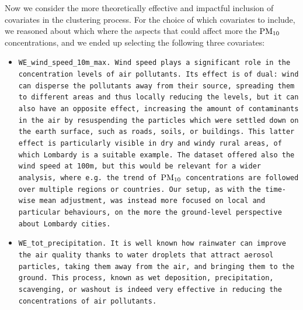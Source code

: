 \documentclass[12pt,	%
	a4paper,		%
	twoside,		%
	openright,		%
	titlepage,%
	]{book}
\theoremstyle{definition}
\begin{document}
Now we consider the more theoretically effective and impactful inclusion of covariates in the clustering process. For the choice of which covariates to include, we reasoned about which where the aspects that could affect more the $\text{PM}_{10}$ concentrations, and we ended up selecting the following three covariates:
\begin{itemize}
    \item \tt{WE\_wind\_speed\_10m\_max}. Wind speed plays a significant role in the concentration levels of air pollutants. Its effect is of dual: wind can disperse the pollutants away from their source, spreading them to different areas and thus locally reducing the levels, but it can also have an opposite effect, increasing the amount of contaminants in the air by resuspending the particles which were settled down on the earth surface, such as roads, soils, or buildings. This latter effect is particularly visible in dry and windy rural areas, of which Lombardy is a suitable example. The dataset offered also the wind speed at 100m, but this would be relevant for a wider analysis, where e.g. the trend of $\text{PM}_{10}$ concentrations are followed over multiple regions or countries. Our setup, as with the time-wise mean adjustment, was instead more focused on local and particular behaviours, on the more the ground-level perspective about Lombardy cities.
    
    \item \tt{WE\_tot\_precipitation}. It is well known how rainwater can improve the air quality thanks to water droplets that attract aerosol particles, taking them away from the air, and bringing them to the ground. This process, known as wet deposition, precipitation, scavenging, or washout is indeed very effective in reducing the concentrations of air pollutants. 


\end{itemize}
\end{document}
